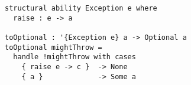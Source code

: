 \begin{algorithm}

\begin{verbatim}
structural ability Exception e where
  raise : e -> a

toOptional : '{Exception e} a -> Optional a
toOptional mightThrow =
  handle !mightThrow with cases
    { raise e -> c }  -> None
    { a }             -> Some a
\end{verbatim}

\caption{Exception ability and handler in Unison. %
\label{alg-eff:unison-exc}}
\end{algorithm}